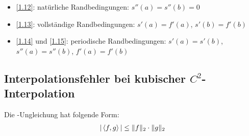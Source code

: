 \begin{*anmerkung}
	\begin{itemize}
		\item \cref{1.12}: natürliche Randbedingungen: $s''(a)=s''(b)=0$
		\item \cref{1.13}: vollständige Randbedingungen: $s'(a)=f'(a)$, $s'(b)=f'(b)$
		\item \cref{1.14} und \cref{1.15}: periodische Randbedingungen: $s'(a)=s'(b)$, $s''(a)=s''(b)$, $f'(a)=f'(b)$
	\end{itemize}
\end{*anmerkung}

\subsection{Interpolationsfehler bei kubischer $C^2$-Interpolation}

\begin{*anmerkung}
	Die -Ungleichung hat folgende Form:
	\begin{align}
		\vert\left\langle f,g\right\rangle\vert \le \Vert f\Vert_2\cdot\Vert g\Vert_2\notag
	\end{align}
\end{*anmerkung}

